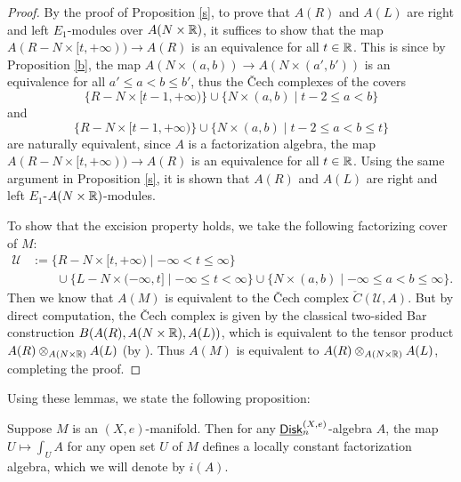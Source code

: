 \documentclass[twoside]{article}
\begin{document}
\begin{proof}
    By the proof of Proposition \ref{s}, to prove that $A(R)$ and $A(L)$ are
    right and left $E_1$-modules over $A(N\times\mathbb{R})$, it suffices to show that the map
    $A(R-N\times[t,+\infty))\to A(R)$ is an equivalence for all $t\in\mathbb{R}$. This is
    since by Proposition \ref{b}, the map $A(N\times(a,b))\to A(N\times(a',b'))$
    is an equivalence for all $a'\le a<b\le b'$, thus the \v{C}ech complexes
    of the covers $$\{R-N\times[t-1,+\infty)\}\cup\{N\times(a,b)\mid t-2\le a<b\}$$
    and $$\{R-N\times[t-1,+\infty)\}\cup\{N\times(a,b)\mid t-2\le a<b\le t\}$$
    are naturally equivalent, since $A$ is a factorization algebra, the map
    $A(R-N\times[t,+\infty))\to A(R)$ is an equivalence for all $t\in\mathbb{R}$. Using
    the same argument in Proposition \ref{s}, it is shown that
    $A(R)$ and $A(L)$ are right and left $E_1$-$A(N\times\mathbb{R})$-modules.

    To show that the excision property holds, we take the following
    factorizing cover of $M$: $$\begin{aligned}\mathscr U&:=\{R-N\times[t,+\infty)
    \mid-\infty<t\le\infty\}\\&\qquad\cup\{L-N\times(-\infty,t]
    \mid-\infty\le t<\infty\}\cup\{N\times(a,b)\mid-\infty\le a<b\le\infty\}.
    \end{aligned}$$
    Then we know that $A(M)$ is equivalent to the \v{C}ech complex 
    $\check{C}(\mathscr U,A)$. But by direct computation, the \v{C}ech complex
    is given by the classical two-sided Bar construction
    $B(A(R),A(N\times\mathbb{R}),A(L))$, which is equivalent to the tensor product
    $A(R)\otimes_{A(N\times\mathbb{R})}A(L)$ (by \cite{CG16}). Thus $A(M)$ is equivalent to
    $A(R)\otimes_{A(N\times\mathbb{R})}A(L)$, completing the proof.
\end{proof}

Using these lemmas, we state the following proposition:

\begin{proposition}\label{i}
    Suppose $M$ is an $(X,e)$-manifold. Then for any $\underline{\smash{\mathsf{Disk}}}_n^{(X,e)}$-algebra
    $A$, the map $U\mapsto\int_UA$ for any open set $U$ of $M$ defines a 
    locally constant factorization algebra, which we will denote by $i(A)$.
\end{proposition}
\end{document}
